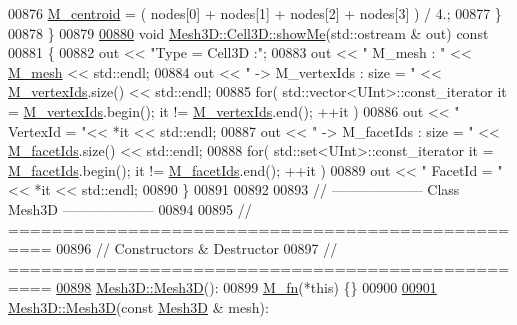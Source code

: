\begin{DoxyCode}
00876         \hyperlink{classFVCode3D_1_1Mesh3D_1_1Cell3D_a85077932a074f0903d085f9d33a13e09}{M\_centroid} = ( nodes[0] + nodes[1] + nodes[2] + nodes[3] ) / 4.;
00877     \}
00878 \}
00879 
\hypertarget{Mesh3D_8cpp_source.tex_l00880}{}\hyperlink{classFVCode3D_1_1Mesh3D_1_1Cell3D_a215649b0f0eac6a30031f98a38f191e6}{00880} \textcolor{keywordtype}{void} \hyperlink{classFVCode3D_1_1Mesh3D_1_1Cell3D_a215649b0f0eac6a30031f98a38f191e6}{Mesh3D::Cell3D::showMe}(std::ostream & out)\textcolor{keyword}{ const}
00881 \textcolor{keyword}{}\{
00882     out << \textcolor{stringliteral}{"Type = Cell3D :"};
00883     out << \textcolor{stringliteral}{" M\_mesh : "} << \hyperlink{classFVCode3D_1_1Mesh3D_1_1Cell3D_a5f593479ad61eb1a043b7ec977db39bb}{M\_mesh} << std::endl;
00884     out << \textcolor{stringliteral}{"  -> M\_vertexIds : size = "} << \hyperlink{classFVCode3D_1_1Mesh3D_1_1Cell3D_a1c43369fa1a00208ff3293aad35a70aa}{M\_vertexIds}.size() << std::endl;
00885     \textcolor{keywordflow}{for}( std::vector<UInt>::const\_iterator it = \hyperlink{classFVCode3D_1_1Mesh3D_1_1Cell3D_a1c43369fa1a00208ff3293aad35a70aa}{M\_vertexIds}.begin(); it != 
      \hyperlink{classFVCode3D_1_1Mesh3D_1_1Cell3D_a1c43369fa1a00208ff3293aad35a70aa}{M\_vertexIds}.end(); ++it )
00886         out << \textcolor{stringliteral}{"    VertexId = "}<< *it << std::endl;
00887     out << \textcolor{stringliteral}{"  -> M\_facetIds : size = "} << \hyperlink{classFVCode3D_1_1Mesh3D_1_1Cell3D_a1aa6b2a5119a2b94946f9a7dcfcb9478}{M\_facetIds}.size() << std::endl;
00888     \textcolor{keywordflow}{for}( std::set<UInt>::const\_iterator it = \hyperlink{classFVCode3D_1_1Mesh3D_1_1Cell3D_a1aa6b2a5119a2b94946f9a7dcfcb9478}{M\_facetIds}.begin(); it != 
      \hyperlink{classFVCode3D_1_1Mesh3D_1_1Cell3D_a1aa6b2a5119a2b94946f9a7dcfcb9478}{M\_facetIds}.end(); ++it )
00889         out << \textcolor{stringliteral}{"    FacetId = "}<< *it << std::endl;
00890 \}
00891 
00892 
00893 \textcolor{comment}{// --------------------   Class Mesh3D   --------------------}
00894 
00895 \textcolor{comment}{// ==================================================}
00896 \textcolor{comment}{// Constructors & Destructor}
00897 \textcolor{comment}{// ==================================================}
\hypertarget{Mesh3D_8cpp_source.tex_l00898}{}\hyperlink{classFVCode3D_1_1Mesh3D_a761b316925bc26ca886e126e9a397bd5}{00898} \hyperlink{classFVCode3D_1_1Mesh3D_a761b316925bc26ca886e126e9a397bd5}{Mesh3D::Mesh3D}():
00899         \hyperlink{classFVCode3D_1_1Mesh3D_ab197671318545b2b026899d435e79ddd}{M\_fn}(*this) \{\}
00900 
\hypertarget{Mesh3D_8cpp_source.tex_l00901}{}\hyperlink{classFVCode3D_1_1Mesh3D_a1d214ce5c2472a00e102176ff4e08eba}{00901} \hyperlink{classFVCode3D_1_1Mesh3D_a761b316925bc26ca886e126e9a397bd5}{Mesh3D::Mesh3D}(\textcolor{keyword}{const} \hyperlink{classFVCode3D_1_1Mesh3D}{Mesh3D} & mesh):

\end{DoxyCode}
